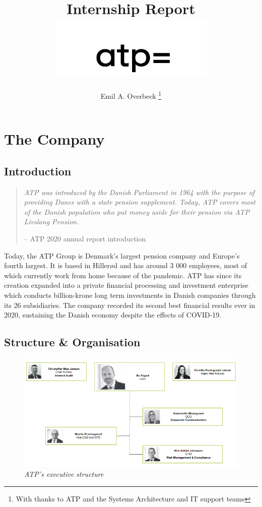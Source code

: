 \documentclass[11pt,titlepage]{article}
\title{\textbf{\Huge{Internship Report}}
        \smallskip
        \includegraphics[width=0.60\textwidth]{logo.png}}
\author{Emil A. Overbeck
        \thanks{With thanks to ATP and the Systems Architecture and IT support teams}}
\date{}
\begin{document}
\maketitle

\tableofcontents

\newpage

%
%
\section{The Company}

\subsection{Introduction}

\begin{quote}
    \color{dgreen}
    \textit{ATP was introduced by the Danish Parliament in 1964 with the purpose of providing Danes with a state pension supplement. Today, ATP covers most of the Danish population who put money aside for their pension via ATP Livslang Pension.}
    \color{black}

    -- ATP 2020 annual report introduction
\end{quote}

Today, the ATP Group is Denmark’s largest pension company and Europe’s fourth largest.\cite{top_pension} It is based in Hillerød and has around 3 000 employees, most of which currently work from home because of the pandemic. ATP has since its creation expanded into a private financial processing and investment enterprise which conducts billion-krone long term investments in Danish companies through its 26 subsidiaries. The company recorded its second best financial results ever in 2020, sustaining the Danish economy despite the effects of COVID-19.\cite{about_atp}


\subsection{Structure \& Organisation}

\begin{figure}[H]
    \centering
    \includegraphics[width=1.00\textwidth]{image2.png}
    \caption*{\textit{ATP's executive structure\cite{about_atp}}}
\end{figure}
\end{document}
